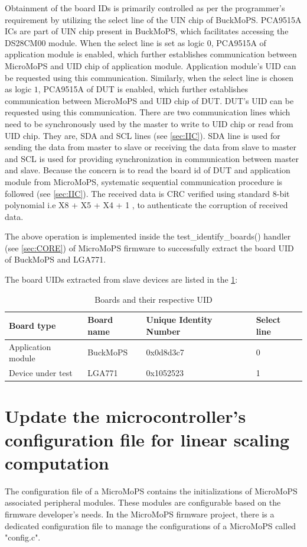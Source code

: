 Obtainment of the board IDs is primarily controlled as per the programmer's requirement by utilizing the select line of the UIN chip of BuckMoPS. 
PCA9515A ICs are part of UIN chip present in BuckMoPS, which facilitates accessing the DS28CM00 module.
When the select line is set as logic $0$, PCA9515A of application module is enabled, which further establishes communication between MicroMoPS and UID chip of application module. 
Application module's UID can be requested using this communication. 
Similarly, when the select line is chosen as logic $1$, PCA9515A of DUT is enabled, which further establishes communication between MicroMoPS and UID chip of \acrshort{DUT}. 
\gls{DUT}'s \acrshort{UID} can be requested using this communication. 
There are two communication lines which need to be synchronously used by the master to write to UID chip or read from UID chip. 
They are, \acrshort{SDA} and \acrshort{SCL} lines (see \cref{sec:IIC}). 
SDA line is used for sending the data from master to slave or receiving the data from slave to master and SCL is used for providing synchronization in communication between master and slave. 
Because the concern is to read the board id of DUT and application module from MicroMoPS, systematic sequential communication procedure is followed (see \cref{sec:IIC}).
The received data is CRC verified using standard 8-bit polynomial i.e X8 + X5 + X4 + 1 \cite{Maxim-DS28CM00-2006a}, to authenticate the corruption of received data.

The above operation is implemented inside the test\_identify\_boards() handler (see \cref{sec:CORE}) of MicroMoPS firmware to successfully extract the board UID of BuckMoPS and LGA771.

The board \glspl{UID} extracted from slave devices are listed in the \cref{Table4}:

\begin{table}[ht]
	\centering
	\caption{Boards and their respective UID}
	\label{Table4}
	\begin{tabular}{|p{2.3cm}||p{3cm}|p{3.5cm}|p{2cm}| }
		\hline
		\textbf{Board type} &\textbf{Board name}   &\textbf{Unique Identity Number}    &\textbf{Select line}\\
		\hline
		Application module	&BuckMoPS   & 0x0d8d3c7   &0 \\
		Device under test &LGA771   	& 0x1052523   &1\\
		\hline
	\end{tabular}
\end{table}

\section{Update the microcontroller's configuration file for linear scaling computation}\label{resn}
The configuration file of a MicroMoPS contains the initializations of MicroMoPS associated peripheral modules. 
These modules are configurable based on the firmware developer's needs.
In the MicroMoPS firmware project, there is a dedicated configuration file to manage the configurations of a MicroMoPS called "config.c".

